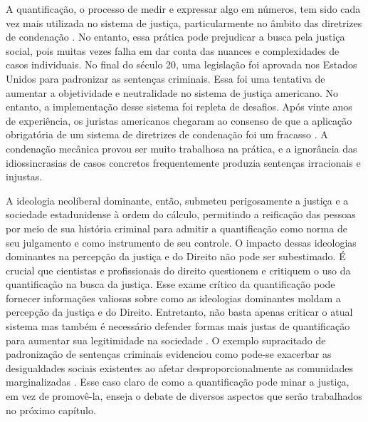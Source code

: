 A quantificação, o processo de medir e expressar algo em números, tem sido cada vez mais utilizada no sistema de justiça, particularmente no âmbito das diretrizes de condenação \cite{salais2016quantification}. No entanto, essa prática pode prejudicar a busca pela justiça social, pois muitas vezes falha em dar conta das nuances e complexidades de casos individuais. No final do século 20, uma legislação foi aprovada nos Estados Unidos para padronizar as sentenças criminais. Essa foi uma tentativa de aumentar a objetividade e neutralidade no sistema de justiça americano. No entanto, a implementação desse sistema foi repleta de desafios. Após vinte anos de experiência, os juristas americanos chegaram ao consenso de que a aplicação obrigatória de um sistema de diretrizes de condenação foi um fracasso \cite{espeland2008sociology}. A condenação mecânica provou ser muito trabalhosa na prática, e a ignorância das idiossincrasias de casos concretos frequentemente produzia sentenças irracionais e injustas.

A ideologia neoliberal dominante, então, submeteu perigosamente a justiça e a sociedade estadunidense à ordem do cálculo, permitindo a reificação das pessoas por meio de sua história criminal para admitir a quantificação como norma de seu julgamento e como instrumento de seu controle. O impacto dessas ideologias dominantes na percepção da justiça e do Direito não pode ser subestimado. É crucial que cientistas e profissionais do direito questionem e critiquem o uso da quantificação na busca da justiça. Esse exame crítico da quantificação pode fornecer informações valiosas sobre como as ideologias dominantes moldam a percepção da justiça e do Direito. Entretanto, não basta apenas criticar o atual sistema mas também é necessário defender formas mais justas de quantificação para aumentar sua legitimidade na sociedade \cite{camargo2022estado}. O exemplo supracitado de padronização de sentenças criminais evidenciou como pode-se exacerbar as desigualdades sociais existentes ao afetar desproporcionalmente as comunidades marginalizadas \cite{lynch2019narrative}. Esse caso claro de como a quantificação pode minar a justiça, em vez de promovê-la, enseja o debate de diversos aspectos que serão trabalhados no próximo capítulo.
